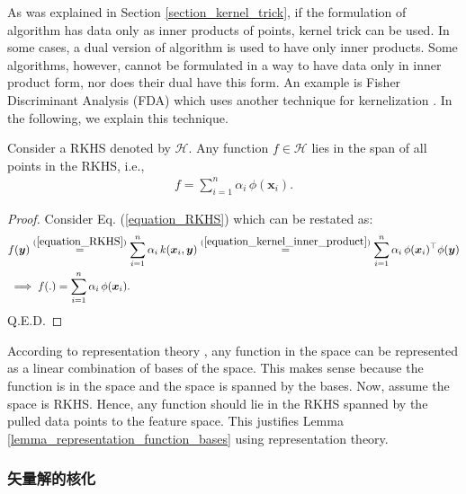 \documentclass[lang=cn,10pt]{gorgeousnbook}
\numberwithin{equation}{section}%
\numberwithin{figure}{section}%
\begin{document}
As was explained in Section \ref{section_kernel_trick}, if the formulation of algorithm has data only as inner products of points, kernel trick can be used. In some cases, a dual version of algorithm is used to have only inner products. 
Some algorithms, however, cannot be formulated in a way to have data only in inner product form, nor does their dual have this form. An example is Fisher Discriminant Analysis (FDA) \cite{ghojogh2019fisher} which uses another technique for kernelization \cite{mika1999fisher}. In the following, we explain this technique. 

\begin{lemma}\label{lemma_representation_function_bases}
Consider a RKHS denoted by $\mathcal{H}$. Any function $f \in \mathcal{H}$ lies in the span of all points in the RKHS, i.e.,
\begin{align}
f = \sum_{i=1}^n \alpha_i\, \phi(\boldsymbol{x}_i).
\end{align}
\end{lemma}
\begin{proof}
Consider Eq. (\ref{equation_RKHS}) which can be restated as:
\begin{align*}
&f(\boldsymbol{y}) \overset{(\ref{equation_RKHS})}{=} \sum_{i=1}^n \alpha_i\, k(\boldsymbol{x}_i, \boldsymbol{y}) \overset{(\ref{equation_kernel_inner_product})}{=} \sum_{i=1}^n \alpha_i\, \phi(\boldsymbol{x}_i)^\top \phi(\boldsymbol{y}) \\
&\implies f(.) = \sum_{i=1}^n \alpha_i\, \phi(\boldsymbol{x}_i).
\end{align*}
Q.E.D.
\end{proof}

\begin{remark}
According to representation theory \cite{alperin1993local}, any function in the space can be represented as a linear combination of bases of the space. This makes sense because the function is in the space and the space is spanned by the bases. Now, assume the space is RKHS. Hence, any function should lie in the RKHS spanned by the pulled data points to the feature space. This justifies Lemma \ref{lemma_representation_function_bases} using representation theory. 
\end{remark}

\subsubsection{矢量解的核化}
\end{document}
